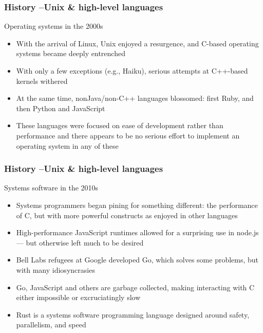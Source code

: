\begin{frame}[plain]
	\frametitle{History --Unix \& high-level languages}
	
	Operating systems in the 2000s
	
	\begin{itemize}
		
		\item   With the arrival of Linux, Unix enjoyed a resurgence, and
		C-based operating systems became deeply entrenched
		
		
		\item With only a few exceptions (e.g., Haiku), serious attempts at
		C++-based kernels withered
		
		
		\item At the same time, non\-Java/non-C++ languages blossomed:
		first Ruby, and then Python and JavaScript
		
		
		\item These languages were focused on ease of development rather
		than performance and there appears to be no serious effort
		to implement an operating system in any of these
		
		
	\end{itemize}
	
\end{frame}
\begin{frame}[plain]
	\frametitle{History --Unix \& high-level languages}
	
	Systems software  in the 2010s
	
	\begin{itemize}
		
		\item  Systems programmers began pining for something different: the
		performance of C, but with more powerful constructs as enjoyed
		in other languages
		
		\item High-performance JavaScript runtimes allowed for a surprising
		use in node.js — but otherwise left much to be desired
		
		\item Bell Labs refugees at Google developed Go, which solves some
		problems, but with many idiosyncrasies
		
		\item  Go, JavaScript and others are garbage collected, making
		interacting with C either impossible or excruciatingly slow
		
		\item Rust is a systems software programming language designed
		around safety, parallelism, and speed
		
		
	\end{itemize}
	
\end{frame}

